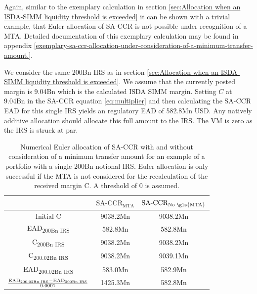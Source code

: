 \documentclass[../Thesis_AHoecherl.tex]{subfiles}
\begin{document}
    Again, similar to the exemplary calculation in section \ref{sec:Allocation when an ISDA-SIMM liquidity threshold is exceeded} it can be shown with a trivial example, that Euler allocation of \gls{SA-CCR} is not possible under recognition of a \gls{MTA}. Detailed documentation of this exemplary calculation may be found in appendix \ref{exemplary-sa-ccr-allocation-under-consideration-of-a-minimum-transfer-amount.}.
    
    We consider the same 200Bn \gls{IRS} as in section \ref{sec:Allocation when an ISDA-SIMM liquidity threshold is exceeded}. We assume that the currently posted margin is 9.04Bn which is the calculated \gls{ISDA SIMM} margin. 
    Setting $C$ at 9.04Bn in the \gls{SA-CCR} equation \ref{eq:multiplier} and then calculating the \gls{SA-CCR} \gls{EAD} for this single \gls{IRS} yields an regulatory \gls{EAD} of 582.8Mn USD. Any natively additive allocation should allocate this full amount to the \gls{IRS}.
    The \gls{VM} is zero as the \gls{IRS} is struck at par.
    \begin{table}[htbp]
        \centering
        \begin{tabular}{c|c|c}
            & $\text{SA-CCR}_{\text{MTA}}$ & $\text{SA-CCR}_{\text{No \gls{MTA}}}$ \\
            \toprule
            Initial C & 9038.2Mn & 9038.2Mn \\
            \midrule
            EAD\textsubscript{200Bn IRS} & 582.8Mn & 582.8Mn \\
            \midrule
            C\textsubscript{200Bn IRS} & 9038.2Mn & 9038.2Mn \\
            \midrule
            C\textsubscript{200.02Bn IRS} & 9038.2Mn & 9039.1Mn \\
            \midrule
            EAD\textsubscript{200.02Bn IRS} & 583.0Mn & 582.9Mn \\
            \midrule
            $\frac{\text{EAD\textsubscript{200.02Bn IRS}}-\text{EAD\textsubscript{200Bn IRS}}}{0.0001}$ & 1425.3Mn & 582.8Mn  \\
        \end{tabular}%
        \caption[Impact of an \gls{MTA} on an allocation]{Numerical Euler allocation of \gls{SA-CCR} with and without consideration of a minimum transfer amount for an example of a portfolio with a single 200Bn notional \gls{IRS}. Euler allocation is only successful if the \gls{MTA} is not considered for the recalculation of the received margin C. A threshold of 0 is assumed.}
        \label{tab:Allocate SA-CCR with MTA calculation}
    \end{table}
\end{document}
